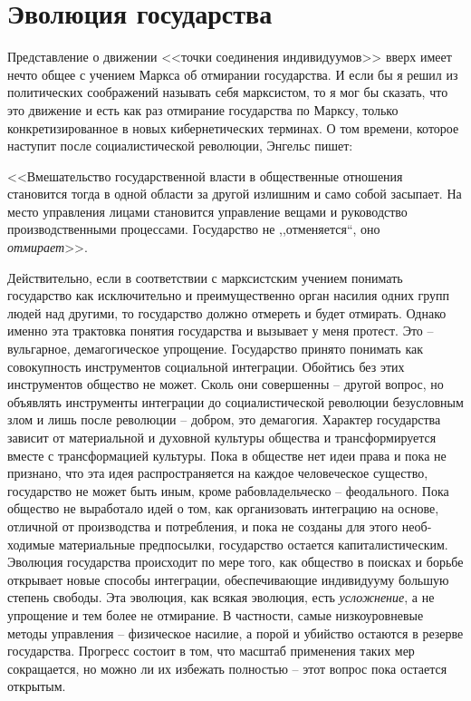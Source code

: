 \documentclass{book}
\begin{document}
\section{Эволюция государства}

Представление о движении <<точки соединения индивиду­умов>> вверх имеет нечто общее с учением Маркса об отмира­нии государства. И если бы я решил из политических сообра­жений называть себя марксистом, то я мог бы сказать, что это движение и есть как раз отмирание государства по Марксу, только конкретизированное в новых кибернетических терми­нах. О том времени, которое наступит после социалистической революции, Энгельс пишет:

<<Вмешательство государственной власти в общественные отношения становится тогда в одной области за другой излиш­ним и само собой засыпает. На место управления лицами стано­вится управление вещами и руководство производственными процессами. Государство не ,,отменяется``, оно \textit{отмирает}>>. 

Действительно, если в соответствии с марксистским учением понимать государство как исключительно и преимущественно орган насилия одних групп людей над другими, то государство должно отмереть и будет отмирать. Однако именно эта трак­товка понятия государства и вызывает у меня протест. Это -- вульгарное, демагогическое упрощение. Государство принято понимать как совокупность инструментов социальной интег­рации. Обойтись без этих инструментов общество не может. Сколь они совершенны -- другой вопрос, но объявлять инстру­менты интеграции до социалистической революции безуслов­ным злом и лишь после революции -- добром, это демагогия.
Характер государства зависит от материальной и духовной культуры общества и трансформируется вместе с трансфор­мацией культуры. Пока в обществе нет идеи права и пока не признано, что эта идея распространяется на каждое человече­ское существо, государство не может быть иным, кроме рабовладельческо -- феодального. Пока общество не выработало идей о том, как организовать интеграцию на основе, отличной от производства и потребления, и пока не созданы для этого необ­ходимые материальные предпосылки, государство остается капиталистическим. Эволюция государства происходит по ме­ре того, как общество в поисках и борьбе открывает новые способы интеграции, обеспечивающие индивидууму большую степень свободы. Эта эволюция, как всякая эволюция, есть \textit{усложнение},  а не упрощение и тем более не отмирание. В част­ности, самые низкоуровневые методы управления -- физическое насилие, а порой и убийство остаются в резерве государства. Прогресс состоит в том, что масштаб применения таких мер сокращается, но можно ли их избежать 
полностью -- этот вопрос пока остается открытым.
\end{document}
